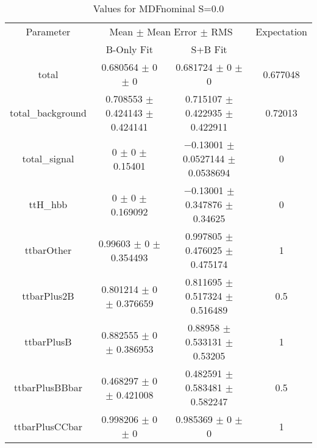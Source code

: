 \begin{table}
\centering
\caption{Values for MDFnominal S=0.0}
\begin{tabular}{cccc}
\toprule
Parameter & \multicolumn{2}{c}{Mean $\pm$ Mean Error $\pm$ RMS} & Expectation\\
 & B-Only Fit & S+B Fit & \\
\midrule
total & \num{0.680564} $\pm$ \num{0} $\pm$ \num{0} & \num{0.681724} $\pm$ \num{0} $\pm$ \num{0} & \num{0.677048}\\
total\_background & \num{0.708553} $\pm$ \num{0.424143} $\pm$ \num{0.424141} & \num{0.715107} $\pm$ \num{0.422935} $\pm$ \num{0.422911} & \num{0.72013}\\
total\_signal & \num{0} $\pm$ \num{0} $\pm$ \num{0.15401} & \num{-0.13001} $\pm$ \num{0.0527144} $\pm$ \num{0.0538694} & \num{0}\\
ttH\_hbb & \num{0} $\pm$ \num{0} $\pm$ \num{0.169092} & \num{-0.13001} $\pm$ \num{0.347876} $\pm$ \num{0.34625} & \num{0}\\
ttbarOther & \num{0.99603} $\pm$ \num{0} $\pm$ \num{0.354493} & \num{0.997805} $\pm$ \num{0.476025} $\pm$ \num{0.475174} & \num{1}\\
ttbarPlus2B & \num{0.801214} $\pm$ \num{0} $\pm$ \num{0.376659} & \num{0.811695} $\pm$ \num{0.517324} $\pm$ \num{0.516489} & \num{0.5}\\
ttbarPlusB & \num{0.882555} $\pm$ \num{0} $\pm$ \num{0.386953} & \num{0.88958} $\pm$ \num{0.533131} $\pm$ \num{0.53205} & \num{1}\\
ttbarPlusBBbar & \num{0.468297} $\pm$ \num{0} $\pm$ \num{0.421008} & \num{0.482591} $\pm$ \num{0.583481} $\pm$ \num{0.582247} & \num{0.5}\\
ttbarPlusCCbar & \num{0.998206} $\pm$ \num{0} $\pm$ \num{0} & \num{0.985369} $\pm$ \num{0} $\pm$ \num{0} & \num{1}\\
\bottomrule
\end{tabular}
\end{table}